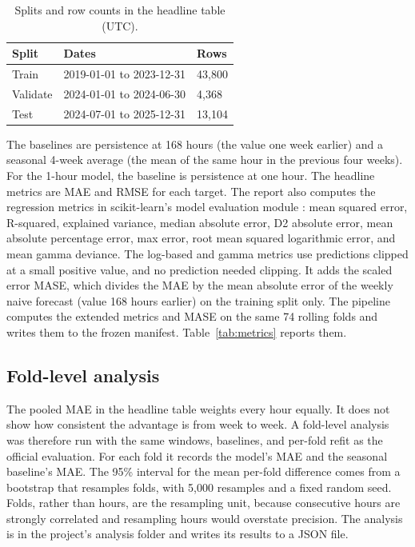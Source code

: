 \documentclass[10pt,journal,compsoc]{IEEEtran}
\begin{document}
\begin{table}[t]
\caption{Splits and row counts in the headline table (UTC).}
\label{tab:splits}
\centering
\small
\begin{tabular}{@{}lll@{}}
\toprule
Split & Dates & Rows \\
\midrule
Train & 2019-01-01 to 2023-12-31 & 43,800 \\
Validate & 2024-01-01 to 2024-06-30 & 4,368 \\
Test & 2024-07-01 to 2025-12-31 & 13,104 \\
\bottomrule
\end{tabular}
\end{table}

The baselines are persistence at 168 hours (the value one week earlier) and a seasonal 4-week average (the mean of the same hour in the previous four weeks). For the 1-hour model, the baseline is persistence at one hour. The headline metrics are MAE and RMSE for each target. The report also computes the regression metrics in scikit-learn's model evaluation module \cite{sklearnmetrics}: mean squared error, R-squared, explained variance, median absolute error, D2 absolute error, mean absolute percentage error, max error, root mean squared logarithmic error, and mean gamma deviance. The log-based and gamma metrics use predictions clipped at a small positive value, and no prediction needed clipping. It adds the scaled error MASE, which divides the MAE by the mean absolute error of the weekly naive forecast (value 168 hours earlier) on the training split only. The pipeline computes the extended metrics and MASE on the same 74 rolling folds and writes them to the frozen manifest. Table~\ref{tab:metrics} reports them.

\subsection{Fold-level analysis}
The pooled MAE in the headline table weights every hour equally. It does not show how consistent the advantage is from week to week. A fold-level analysis was therefore run with the same windows, baselines, and per-fold refit as the official evaluation. For each fold it records the model's MAE and the seasonal baseline's MAE. The 95\% interval for the mean per-fold difference comes from a bootstrap that resamples folds, with 5,000 resamples and a fixed random seed. Folds, rather than hours, are the resampling unit, because consecutive hours are strongly correlated and resampling hours would overstate precision. The analysis is in the project's analysis folder and writes its results to a JSON file.
\end{document}
